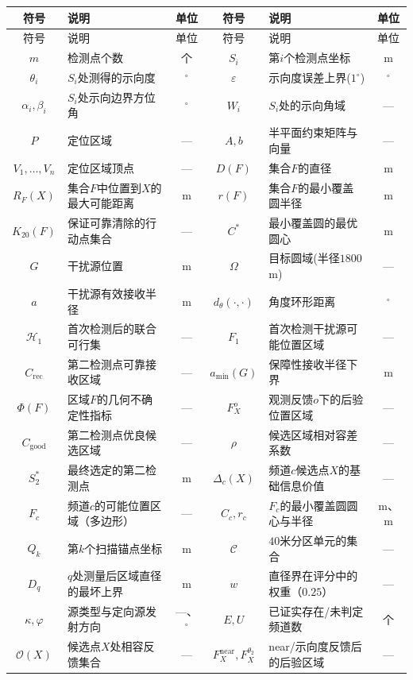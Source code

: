 \documentclass[withoutpreface]{cumcmthesis}
\begin{document}
\begin{longtable}{c p{4.2cm} c | c p{4.2cm} c}
\toprule
符号 & 说明 & 单位 & 符号 & 说明 & 单位 \\
\midrule
\endfirsthead
\toprule
符号 & 说明 & 单位 & 符号 & 说明 & 单位 \\
\midrule
\endhead
\bottomrule
\endfoot
\bottomrule
\endlastfoot
$m$ & 检测点个数 & 个 & $S_i$ & 第$i$个检测点坐标 & m \\
$\theta_i$ & $S_i$处测得的示向度 & $^\circ$ & $\varepsilon$ & 示向度误差上界($1^\circ$) & $^\circ$ \\
$\alpha_i,\beta_i$ & $S_i$处示向边界方位角 & $^\circ$ & $W_i$ & $S_i$处的示向角域 & --- \\
$P$ & 定位区域 & --- & $A,b$ & 半平面约束矩阵与向量 & --- \\
$V_1,\ldots,V_n$ & 定位区域顶点 & --- & $D(F)$ & 集合$F$的直径 & m \\
$R_F(X)$ & 集合$F$中位置到$X$的最大可能距离 & m & $r(F)$ & 集合$F$的最小覆盖圆半径 & m \\
$K_{20}(F)$ & 保证可靠清除的行动点集合 & --- & $C^\ast$ & 最小覆盖圆的最优圆心 & m \\
$G$ & 干扰源位置 & m & $\Omega$ & 目标圆域(半径$1800$\,m) & --- \\
$a$ & 干扰源有效接收半径 & m & $d_\theta(\cdot,\cdot)$ & 角度环形距离 & $^\circ$ \\
$\mathcal{H}_1$ & 首次检测后的联合可行集 & --- & $F_1$ & 首次检测干扰源可能位置区域 & --- \\
$C_{\mathrm{rec}}$ & 第二检测点可靠接收区域 & --- & $a_{\min}(G)$ & 保障性接收半径下界 & m \\
$\Phi(F)$ & 区域$F$的几何不确定性指标 & --- & $F_X^o$ & 观测反馈$o$下的后验位置区域 & --- \\
$C_{\mathrm{good}}$ & 第二检测点优良候选区域 & --- & $\rho$ & 候选区域相对容差系数 & --- \\
$S_2^*$ & 最终选定的第二检测点 & m & $\Delta_c(X)$ & 频道$c$候选点$X$的基础信息价值 & --- \\
$F_c$ & 频道$c$的可能位置区域（多边形） & --- & $C_c,r_c$ & $F_c$的最小覆盖圆圆心与半径 & m、m \\
$Q_k$ & 第$k$个扫描锚点坐标 & m & $\mathcal{C}$ & $40$米分区单元的集合 & --- \\
$D_q$ & $q$处测量后区域直径的最坏上界 & m & $w$ & 直径界在评分中的权重（$0.25$） & --- \\
$\kappa,\varphi$ & 源类型与定向源发射方向 & ---、$^\circ$ & $E,U$ & 已证实存在/未判定频道数 & 个 \\
$\mathcal O(X)$ & 候选点$X$处相容反馈集合 & --- & $F_X^{\mathrm{near}},F_X^{\theta_2}$ & near/示向度反馈后的后验区域 & --- \\
\end{longtable}
\end{document}
